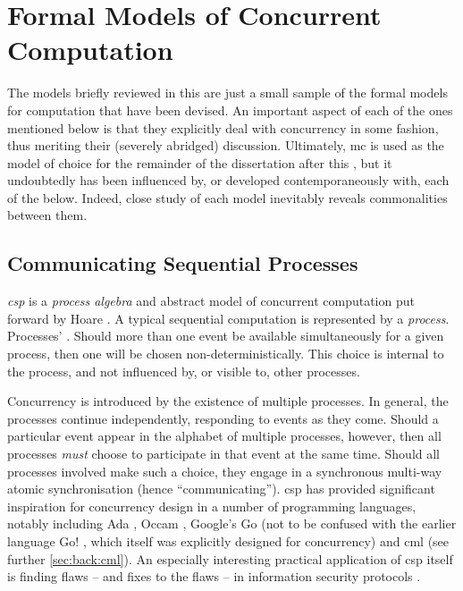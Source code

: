 \section{\label{sec:back:formalmodels}Formal Models of Concurrent Computation}
The models briefly reviewed in this  are just a small sample of the formal models for computation that have been devised.  An important aspect of each of the ones mentioned below is that they explicitly deal with concurrency in some fashion, thus meriting their (severely abridged) discussion.  Ultimately, \gls{mc} is used as the model of choice for the remainder of the dissertation after this , but it undoubtedly has been influenced by, or developed contemporaneously with, each of the below.  Indeed, close study of each model inevitably reveals commonalities between them.

\subsection{\label{subsec:back:csp}Communicating Sequential Processes}

\emph{\Gls{csp}} is a \emph{process algebra} and abstract model of concurrent computation put forward by Hoare \cite{Hoare1985,Roscoe2011}.  A typical sequential computation is represented by a \emph{process}.  Processes' .  Should more than one event be available simultaneously for a given process, then one will be chosen non-deterministically.  This choice is internal to the process, and not influenced by, or visible to, other processes.

Concurrency is introduced by the existence of multiple processes.  In general, the processes continue independently, responding to events as they come.  Should a particular event appear in the alphabet of multiple processes, however, then all processes \emph{must} choose to participate in that event at the same time.  Should all processes involved make such a choice, they engage in a synchronous multi-way atomic synchronisation (hence ``communicating'').  \gls{csp} has provided significant inspiration for concurrency design in a number of programming languages, notably including Ada \cite{Defense1983,Taft2013}, Occam \cite{Elizabeth1987}, Google's Go \cite{Meyerson2014} (not to be confused with the earlier language Go! \cite{Clark2004}, which itself was explicitly designed for concurrency) and \gls{cml} \cite{Reppy2011} (see further \vref{sec:back:cml}).  An especially interesting practical application of \gls{csp} itself is finding flaws -- and fixes to the flaws -- in information security protocols \cite{Roscoe1995,Lowe1996,Koltuksuz2010}.

